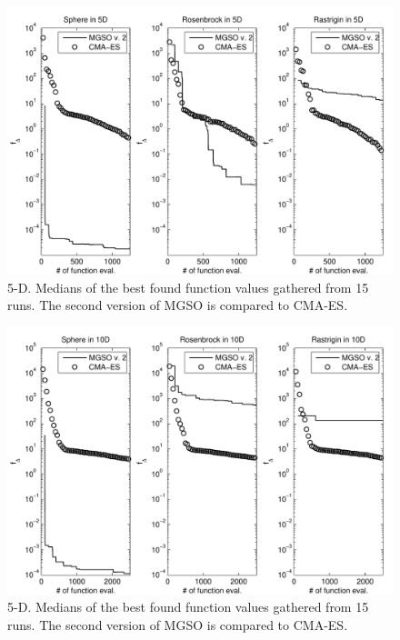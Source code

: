 \documentclass{itatnew}
\begin{document}
\begin{figure}
  \centering
  \includegraphics[width=\linewidth]{optim_5D}
  {\small
    \caption{5-D. Medians of the best found function values gathered from 15 runs. The second version of MGSO is compared to CMA-ES.
  \label{fig:optim_5D}
  }
  }
\end{figure}

\begin{figure}
  \centering
  \includegraphics[width=\linewidth]{optim_10D}
  {\small
    \caption{5-D. Medians of the best found function values gathered from 15 runs. The second version of MGSO is compared to CMA-ES.
  \label{fig:optim_10D}
  }
  }
\end{figure}
\end{document}
